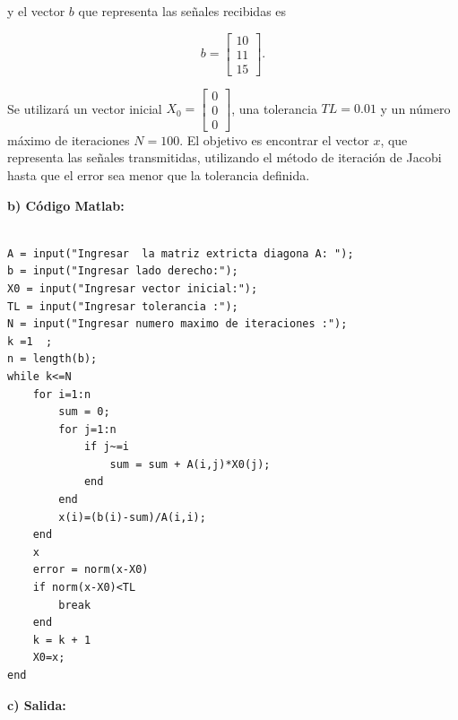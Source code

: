 \documentclass[12pt,a4paper,twoside]{article}  %
\begin{document}
y el vector \( b \) que representa las señales recibidas es 

\[
b = \begin{bmatrix}
10 \\
11 \\
15
\end{bmatrix}.
\]

Se utilizará un vector inicial \( X_0 = \begin{bmatrix} 0 \\ 0 \\ 0 \end{bmatrix} \), una tolerancia \( TL = 0.01 \) y un número máximo de iteraciones \( N = 100 \). El objetivo es encontrar el vector \( x \), que representa las señales transmitidas, utilizando el método de iteración de Jacobi hasta que el error sea menor que la tolerancia definida.

\textbf{b) Código Matlab:}

\begin{lstlisting}

A = input("Ingresar  la matriz extricta diagona A: ");
b = input("Ingresar lado derecho:");
X0 = input("Ingresar vector inicial:");
TL = input("Ingresar tolerancia :");
N = input("Ingresar numero maximo de iteraciones :");
k =1  ;
n = length(b);
while k<=N
    for i=1:n
        sum = 0;
        for j=1:n
            if j~=i
                sum = sum + A(i,j)*X0(j);
            end
        end
        x(i)=(b(i)-sum)/A(i,i);
    end
    x
    error = norm(x-X0)
    if norm(x-X0)<TL
        break
    end
    k = k + 1
    X0=x;     
end

\end{lstlisting}

\textbf{c) Salida:}
\end{document}
